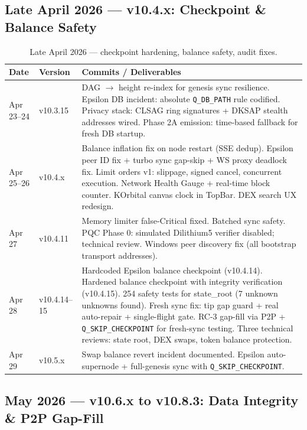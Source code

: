 \documentclass[12pt,a4paper]{article}
\begin{document}
\subsection*{Late April 2026 — v10.4.x: Checkpoint \& Balance Safety}

\begin{table}[H]
\centering
\small
\renewcommand{\arraystretch}{1.28}
\begin{tabularx}{\linewidth}{@{}l l X@{}}
\toprule
\textbf{Date} & \textbf{Version} & \textbf{Commits / Deliverables} \\
\midrule
Apr 23--24 & v10.3.15 &
  DAG $\to$ height re-index for genesis sync resilience.
  Epsilon DB incident: absolute \texttt{Q\_DB\_PATH} rule codified.
  Privacy stack: CLSAG ring signatures + DKSAP stealth addresses wired.
  Phase 2A emission: time-based fallback for fresh DB startup. \\
\rowcolor{qblue!10}
Apr 25--26 & v10.4.x &
  Balance inflation fix on node restart (SSE dedup).
  Epsilon peer ID fix + turbo sync gap-skip + WS proxy deadlock fix.
  Limit orders v1: slippage, signed cancel, concurrent execution.
  Network Health Gauge + real-time block counter.
  KOrbital canvas clock in TopBar.
  DEX search UX redesign. \\
Apr 27 & v10.4.11 &
  Memory limiter false-Critical fixed.
  Batched sync safety.
  PQC Phase 0: simulated Dilithium5 verifier disabled; technical review.
  Windows peer discovery fix (all bootstrap transport addresses). \\
\rowcolor{qblue!10}
Apr 28 & v10.4.14--15 &
  Hardcoded Epsilon balance checkpoint (v10.4.14).
  Hardened balance checkpoint with integrity verification (v10.4.15).
  254 safety tests for state\_root (7 unknown unknowns found).
  Fresh sync fix: tip gap guard + real auto-repair + single-flight gate.
  RC-3 gap-fill via P2P + \texttt{Q\_SKIP\_CHECKPOINT} for fresh-sync testing.
  Three technical reviews: state root, DEX swaps, token balance protection. \\
Apr 29 & v10.5.x &
  Swap balance revert incident documented.
  Epsilon auto-supernode + full-genesis sync with \texttt{Q\_SKIP\_CHECKPOINT}. \\
\bottomrule
\end{tabularx}
\caption{Late April 2026 — checkpoint hardening, balance safety, audit fixes.}
\end{table}

\subsection*{May 2026 — v10.6.x to v10.8.3: Data Integrity \& P2P Gap-Fill}
\end{document}
